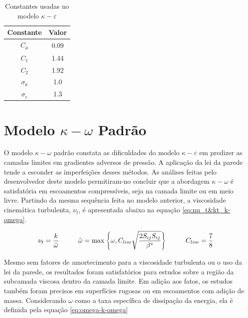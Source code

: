 \begin{table}[ht]
\centering
\caption[Constantes usadas no modelo \(\kappa-\varepsilon\).]{Constantes usadas no modelo \(\kappa-\varepsilon\) \cite{JONES1972301}}
\vspace{0.5cm}
\begin{tabular}{c|c}
 
Constante & Valor \\
\hline
\(C_{\mu}\) 				& \num{0,09} \\
\(C_{1}\) 					& \num{1,44} \\
\(C_{2}\) 					& \num{1,92} \\
\(\sigma_{k}\) 				& \num{1,0} \\
\(\sigma_{\varepsilon}\) 	& \num{1,3}

\end{tabular}
\label{tab:tabela-constantes-k-epsilon}
\end{table}

\section{Modelo \texorpdfstring{\(\kappa-\omega\)}{k-w} Padrão}

O modelo \(\kappa-\omega\) padrão \cite{Wilcox1988ReassessmentOT,Wilcox2006,Wilcox2008} constata as dificuldades do modelo \(\kappa-\varepsilon\) em predizer as camadas limites em gradientes adversos de pressão. A aplicação da lei da parede tende a esconder as imperfeições desses métodos. As análises feitas pelo desenvolvedor deste modelo permitiram-no concluir que a abordagem \(\kappa-\omega\) é satisfatória em escoamentos compressíveis, seja na camada limite ou em meio livre. Partindo da mesma sequência feita no modelo anterior, a viscosidade cinemática turbulenta, \(\nu_{t}\), é apresentada abaixo na equação \ref{eq:nu_t&kt_k-omega}.

\begin{equation}
    \nu_t = \frac{k}{\tilde{\omega}}
   	\hspace{1.0cm}
    \tilde{\omega} = \max{\left\lbrace \omega, C_{lim}\sqrt{\frac{2 S_{ij}S_{ij}}{\beta^*}}\right\rbrace}
    \hspace{1.0cm}
    C_{lim} = \frac{7}{8}
    \label{eq:nu_t&kt_k-omega}
\end{equation}

Mesmo sem fatores de amortecimento para a viscosidade turbulenta ou o uso da lei da parede, os resultados foram satisfatórios para estudos sobre a região da subcamada viscosa dentro da camada limite. Em adição aos fatos, os estudos também foram precisos em superfícies rugosas ou em escoamentos com adição de massa. Considerando \(\omega\) como a taxa específica de dissipação da energia, ela é definida pela equação \ref{eq:omega-k-omega}

